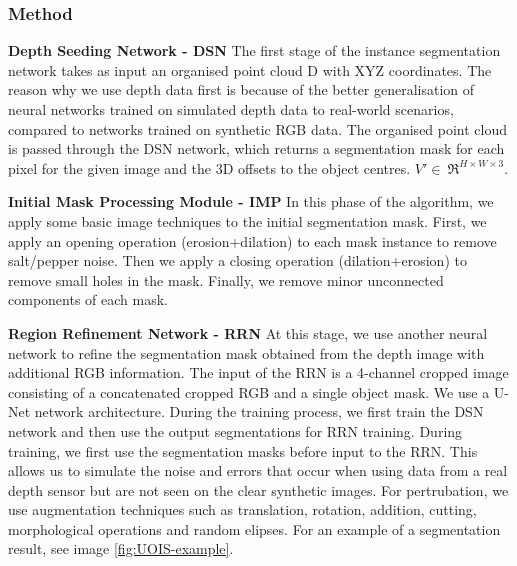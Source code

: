 \documentclass[10pt,twocolumn,letterpaper]{article}
\begin{document}
\subsubsection{Method}

\textbf{Depth Seeding Network - DSN}
The first stage of the instance segmentation network takes as input an organised point cloud D with XYZ coordinates. The reason why we use depth data first is because of the better generalisation of neural networks trained on simulated depth data to real-world scenarios, compared to networks trained on synthetic RGB data. The organised point cloud is passed through the DSN network, which returns a segmentation mask for each pixel for the given image and the 3D offsets to the object centres. \(V'\in\ \Re^{H \times W \times 3}\).

\textbf{Initial Mask Processing Module - IMP }
In this phase of the algorithm, we apply some basic image techniques to the initial segmentation mask. First, we apply an opening operation (erosion+dilation) to each mask instance to remove salt/pepper noise. Then we apply a closing operation (dilation+erosion) to remove small holes in the mask. Finally, we remove minor unconnected components of each mask. 

\textbf{Region Refinement Network - RRN}
At this stage, we use another neural network to refine the segmentation mask obtained from the depth image with additional RGB information. The input of the RRN is a 4-channel cropped image consisting of a concatenated cropped RGB and a single object mask. We use a U-Net \cite{u-net} network architecture.
During the training process, we first train the DSN network and then use the output segmentations for RRN training. During training, we first use the segmentation masks before input to the RRN. This allows us to simulate the noise and errors that occur when using data from a real depth sensor but are not seen on the clear synthetic images. For pertrubation, we use augmentation techniques such as translation, rotation, addition, cutting, morphological operations and random elipses. For an example of a segmentation result, see image \ref{fig:UOIS-example}. 
\end{document}
